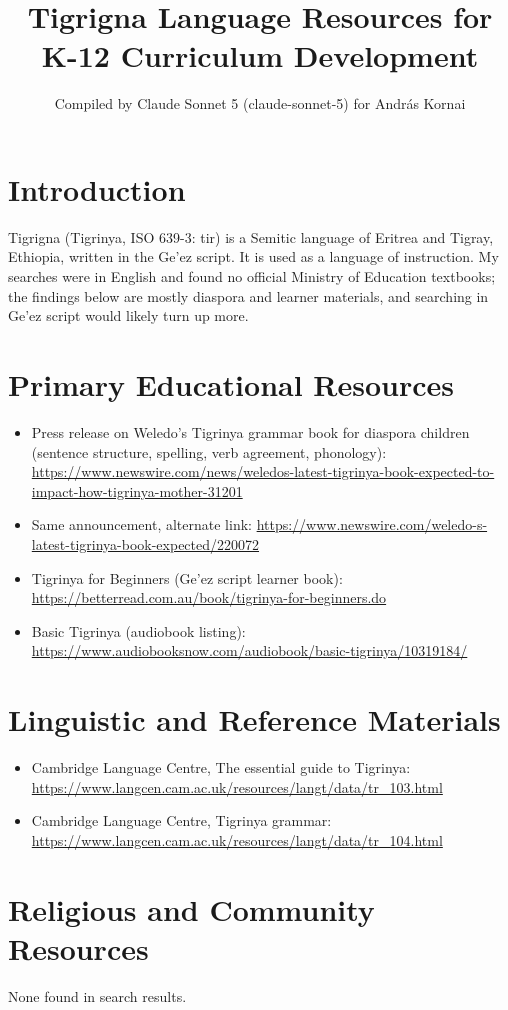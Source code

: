 \documentclass[12pt]{article}
\title{Tigrigna Language Resources for K-12 Curriculum Development}
\author{Compiled by Claude Sonnet 5 (claude-sonnet-5) for Andr\'as Kornai}
\date{}
\begin{document}
\maketitle

\section{Introduction}
Tigrigna (Tigrinya, ISO 639-3: tir) is a Semitic language of Eritrea and Tigray, Ethiopia, written in the Ge'ez script. It is used as a language of instruction. My searches were in English and found no official Ministry of Education textbooks; the findings below are mostly diaspora and learner materials, and searching in Ge'ez script would likely turn up more.

\section{Primary Educational Resources}
\begin{itemize}
\item Press release on Weledo's Tigrinya grammar book for diaspora children (sentence structure, spelling, verb agreement, phonology): \url{https://www.newswire.com/news/weledos-latest-tigrinya-book-expected-to-impact-how-tigrinya-mother-31201}
\item Same announcement, alternate link: \url{https://www.newswire.com/weledo-s-latest-tigrinya-book-expected/220072}
\item Tigrinya for Beginners (Ge'ez script learner book): \url{https://betterread.com.au/book/tigrinya-for-beginners.do}
\item Basic Tigrinya (audiobook listing): \url{https://www.audiobooksnow.com/audiobook/basic-tigrinya/10319184/}
\end{itemize}

\section{Linguistic and Reference Materials}
\begin{itemize}
\item Cambridge Language Centre, The essential guide to Tigrinya: \url{https://www.langcen.cam.ac.uk/resources/langt/data/tr_103.html}
\item Cambridge Language Centre, Tigrinya grammar: \url{https://www.langcen.cam.ac.uk/resources/langt/data/tr_104.html}
\end{itemize}

\section{Religious and Community Resources}
None found in search results.
\end{document}
